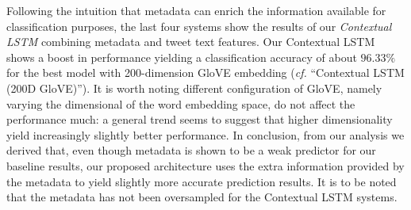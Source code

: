 Following the intuition that metadata can enrich the information available for classification purposes, the last four systems show the results of our \textit{Contextual LSTM} combining metadata and tweet text features. Our Contextual LSTM shows a boost in performance yielding a classification accuracy of about $96.33\%$ for the best model with 200-dimension GloVE embedding (\textit{cf.} ``Contextual LSTM (200D GloVE)''). It is worth noting different configuration of GloVE, namely varying the dimensional of the word embedding space, do not affect the performance much: a general trend seems to suggest that higher dimensionality yield increasingly slightly better performance.
In conclusion, from our analysis we derived that, even though metadata is shown to be a weak predictor for our baseline results, our proposed architecture uses the extra information provided by the metadata to yield slightly more accurate prediction results. It is to be noted that the metadata has not been oversampled for the Contextual LSTM systems. \par

